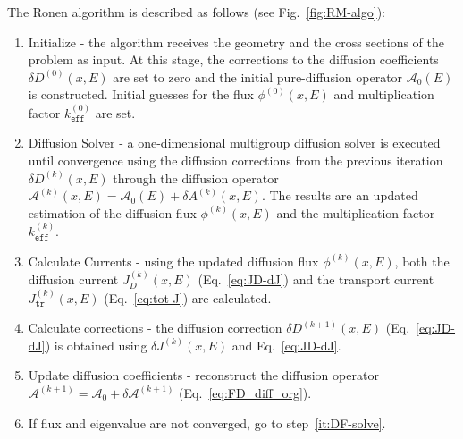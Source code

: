 The Ronen algorithm is described as follows (see Fig.~\ref{fig:RM-algo}):
\begin{enumerate}
	\item\label{it:init} Initialize - the algorithm receives the geometry and the cross sections of the problem as input. At this stage, the corrections to the diffusion coefficients $\delta D^{(0)}(x,E)$ are set to zero and the initial pure-diffusion operator $\mathcal{A}_0(E)$ is constructed. Initial guesses for the flux $\phi^{(0)}(x,E)$ and multiplication factor $k^{(0)}_\texttt{eff}$ are set.
	\item\label{it:DF-solve} Diffusion Solver - a one-dimensional multigroup diffusion solver is executed until convergence using the diffusion corrections from the previous iteration $\delta D^{(k)}(x,E)$ through the diffusion operator $\mathcal{A}^{(k)}(x,E)=\mathcal{A}_0(E)+\delta A^{(k)}(x,E)$. The results are an updated estimation of the diffusion flux $\phi^{(k)}(x,E)$ and the multiplication factor $k^{(k)}_\texttt{eff}$.
	\item\label{it:Js} Calculate Currents - using the updated diffusion flux $\phi^{(k)}(x,E)$, both the diffusion current $J^{(k)}_D(x,E)$ (Eq.~\ref{eq:JD-dJ}) and the transport current $J^{(k)}_\texttt{tr}(x,E)$ (Eq.~\ref{eq:tot-J}) are calculated.
	\item\label{it:dD} Calculate corrections - the diffusion correction $\delta D^{(k+1)}(x,E)$ (Eq.~\ref{eq:JD-dJ}) is obtained using $\delta J^{(k)}(x,E)$ and Eq.~\eqref{eq:JD-dJ}.
	\item\label{it:dA} Update diffusion coefficients - reconstruct the diffusion operator $\mathcal{A}^{(k+1)} = \mathcal{A}_0+\delta \mathcal{A}^{(k+1)}$ (Eq.~\ref{eq:FD_diff_org}).
	\item\label{it:conv} If flux and eigenvalue are not converged, go to step~\ref{it:DF-solve}.
\end{enumerate}

